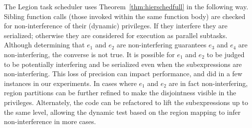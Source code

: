  The Legion task scheduler uses Theorem~\ref{thm:hierschedfull} in the
following way.  Sibling function calls (those invoked within the same
function body) are checked for non-interference of their (dynamic)
privileges.  If they interfere they are serialized; otherwise they are
considered for execution as parallel subtasks.  Although determining that $e_1$
and $e_2$ are non-interfering guarantees $e_3$ and $e_4$ are
non-interfering, the converse is not true.  It is possible for $e_1$
and $e_2$ to be judged to be potentially interfering and be serialized
even when the subexpressions are non-interfering.  This loss of
precision can impact performance, and did in a few instances in our
experiments.  
In cases where $e_1$ and $e_2$ are in fact
non-interfering, region partitions can be further refined to make the
disjointness visible in the privileges.  Alternately, the code can be
refactored to lift the subexpressions up to the same level, allowing
the dynamic test based on the region mapping to infer non-interference
in more cases.  

